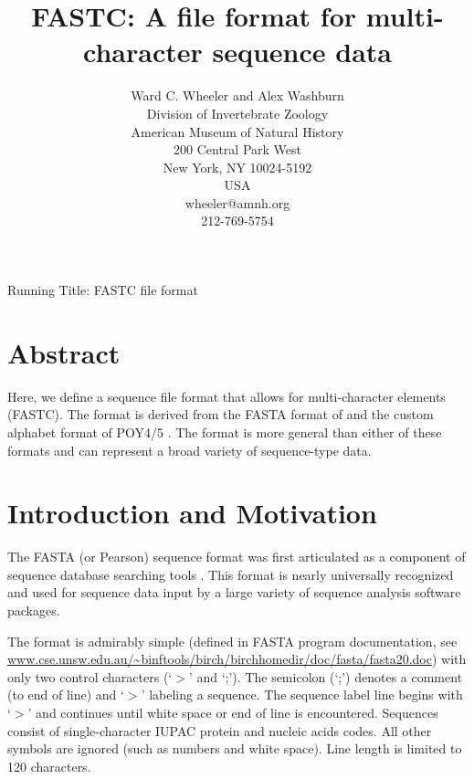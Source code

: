 \documentclass[12pt]{article}
\begin{document}
\title{FASTC: A file format for multi-character sequence data}
\author{Ward C. Wheeler and Alex Washburn \\
		Division of  Invertebrate Zoology\\
		American Museum of Natural History\\
		200 Central Park West\\
		New York, NY 10024-5192\\
		USA\\
		wheeler@amnh.org\\
		212-769-5754}

\maketitle
\begin{center}
Running Title: FASTC file format
\end{center}
\newpage
\doublespacing

\section{Abstract}
Here, we define a sequence file format that allows for multi-character elements (FASTC).  The format is derived from the FASTA format of \cite{LipmanandPearson1985} and the custom alphabet format of POY4/5 \citep{POY4,Wheeleretal2015}.  The format is more general than either of these formats and can represent a broad variety of sequence-type data.

\newpage
\tableofcontents
\newpage

\section{Introduction and Motivation}
The FASTA (or Pearson) sequence format was first articulated as a component of sequence database searching tools
\citep{LipmanandPearson1985}.  This format is nearly universally recognized and used for sequence data input 
by a large variety of sequence analysis software packages.

The format is admirably simple (defined in FASTA program documentation, see \url{www.cse.unsw.edu.au/~binftools/birch/birchhomedir/doc/fasta/fasta20.doc}) with 
only two control characters (`$>$' and `;').  The semicolon (`;') denotes a comment (to end of line) and `$>$' labeling a sequence.  
The sequence label line begins with `$>$' and continues until white space or end of line is encountered.  Sequences consist of single-character
IUPAC protein and nucleic acids codes.  All other symbols are ignored (such as numbers and white space).  Line length is limited to 120 characters.
\end{document}
